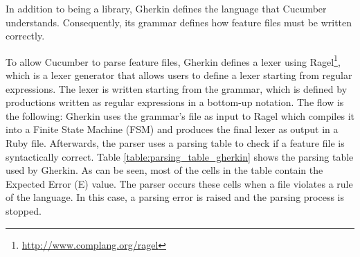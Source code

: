 In addition to being a library, Gherkin defines the language that Cucumber understands. Consequently, its grammar defines how feature files must be written correctly.

To allow Cucumber to parse feature files, Gherkin defines a lexer using Ragel\footnote{\url{http://www.complang.org/ragel}}, which is a lexer generator that allows users to define a lexer starting from regular expressions.
The lexer is written starting from the grammar, which is defined by productions written as regular expressions in a bottom-up notation. The flow is the following: Gherkin uses the grammar's file as input to Ragel which compiles it into a Finite State Machine (FSM) and produces the final lexer as output in a Ruby file. Afterwards, the parser uses a parsing table to check if a feature file is syntactically correct. Table \ref{table:parsing_table_gherkin} shows the parsing table used by Gherkin. As can be seen, most of the cells in the table contain the Expected Error (E) value. The parser occurs these cells when a file violates a rule of the language. In this case, a parsing error is raised and the parsing process is stopped.

